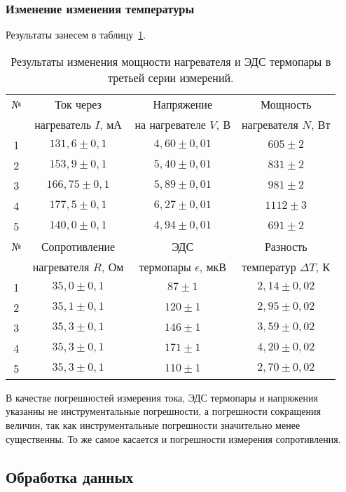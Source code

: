 \documentclass[a4paper,11pt]{article}
\begin{document}
\subsubsection{Изменение изменения температуры}
Результаты занесем в таблицу~\ref{table:tab6}.
\begin{table}[h!]
\centering
\begin{tabular}{ ||c|c|c|c|| }
  \hline
  № & Ток через & Напряжение & Мощность \\
   & нагреватель $I$, $мА$ & на нагревателе $V$, $В$ & нагревателя $N$, $Вт$ \\
  \hline
  1 & $131,6 \pm 0,1$ & $4,60 \pm 0,01$ & $605 \pm 2$ \\
  2 & $153,9 \pm 0,1$ & $5,40 \pm 0,01$ & $831 \pm 2$ \\
  3 & $166,75 \pm 0,1$ & $5,89 \pm 0,01$ & $981 \pm 2$ \\
  4 & $177,5 \pm 0,1$ & $6,27 \pm 0,01$ & $1112 \pm 3$ \\
  5 & $140,0 \pm 0,1$ & $4,94 \pm 0,01$ & $691 \pm 2$ \\
  \hline\hline
  № & Сопротивление & ЭДС & Разность \\
   & нагревателя $R$, $Ом$ & термопары $\epsilon$, $мкВ$ & температур $\Delta T$, $К$ \\
  \hline
  1 & $35,0 \pm 0,1$ & $87 \pm 1$ & $2,14 \pm 0,02$ \\
  2 & $35,1 \pm 0,1$ & $120 \pm 1$ & $2,95 \pm 0,02$ \\
  3 & $35,3 \pm 0,1$ & $146 \pm 1$ & $3,59 \pm 0,02$ \\
  4 & $35,3 \pm 0,1$ & $171 \pm 1$ & $4,20 \pm 0,02$ \\
  5 & $35,3 \pm 0,1$ & $110 \pm 1$ & $2,70 \pm 0,02$ \\
  \hline
\end{tabular}
\caption{Результаты изменения мощности нагревателя и ЭДС термопары в третьей серии измерений.}
\label{table:tab6}
\end{table}\newline
\newline
В качестве погрешностей измерения тока, ЭДС термопары и напряжения указанны не инструментальные погрешности, а погрешности сокращения величин, так как инструментальные погрешности значительно менее существенны. То же самое касается и погрешности измерения сопротивления.
\subsection{Обработка данных}
\end{document}
